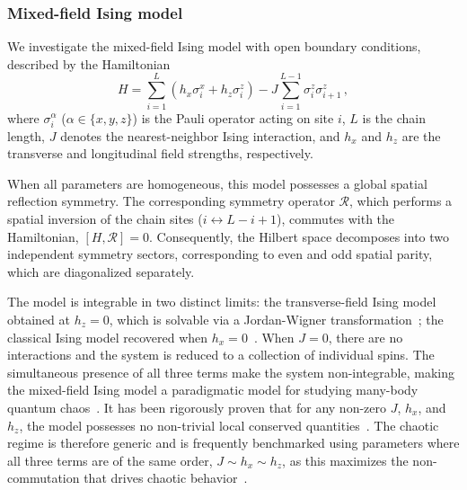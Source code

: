 \documentclass[letterpaper,superscriptaddress,aps,pra,nolongbibliography,showpacs,floatfix,dvipsnames,10pt,twocolumn]{revtex4-2}
\begin{document}
\subsubsection{Mixed-field Ising model}\label{sec:ising}
We investigate the mixed-field Ising model with open boundary 
conditions, described by the Hamiltonian
\begin{equation}\label{eq:H:ising}
H = \sum_{i=1}^L \left( h_x \sigma_i^x + h_z \sigma_i^z \right) 
- J \sum_{i=1}^{L-1} \sigma_i^z \sigma_{i+1}^z \, ,
\end{equation}
where $\sigma_i^\alpha$ ($\alpha \in \{x,y,z\}$) is the Pauli operator 
acting on site $i$, $L$ is the chain length, $J$ denotes the 
nearest-neighbor Ising interaction, and $h_x$ and $h_z$ are the 
transverse and longitudinal field strengths, respectively.

When all parameters are homogeneous, this model possesses a global
spatial reflection symmetry. The corresponding symmetry operator
$\mathcal{R}$, which performs a spatial inversion of the chain
sites ($i \leftrightarrow L-i+1$), commutes with the Hamiltonian,
$[H, \mathcal{R}] = 0$. Consequently, the Hilbert space decomposes
into two independent symmetry sectors, corresponding to even and
odd spatial parity, which are diagonalized separately.

The model is integrable in two distinct limits: the transverse-field
Ising model obtained at $h_z = 0$, which is solvable via a Jordan-Wigner
transformation~\cite{sachdev_2011_quantum}; the
classical Ising model recovered when $h_x = 0$~\cite{baxter_2007_exactly}.
When $J=0$, there are no interactions and the system is reduced to a collection 
of individual spins. 
The simultaneous presence of all three terms make the 
system non-integrable, making the mixed-field Ising model
a paradigmatic model for studying many-body quantum chaos~\cite{kim_2014_testing,garrison_2018_does,borgonovi_2016_quantum}. It has been rigorously proven that for any non-zero
$J$, $h_x$, and $h_z$, the model possesses no non-trivial local
conserved quantities~\cite{chiba_2024_proof}. The chaotic regime is therefore
generic and is frequently benchmarked using parameters where all three
terms are of the same order, $J \sim h_x \sim h_z$, as this maximizes
the non-commutation that drives chaotic behavior~\cite{karthik_2007_entanglement,atas_2017_quantum,camargo_2024_spread}.
\end{document}
